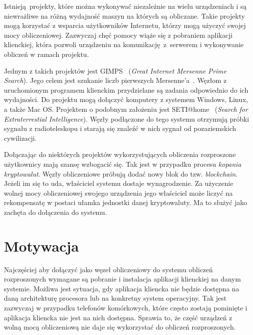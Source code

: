 \documentclass[a4paper,11pt,twoside]{report}
\theoremstyle{definition}
\begin{document}
    Istnieją projekty, które można wykonywać niezależnie na wielu urządzeniach i są niewrażliwe na różną wydajność maszyn na których są obliczane.
    Takie projekty mogą korzystać z wsparcia użytkowników Internetu, którzy mogą użyczyć swojej mocy obliczeniowej.
    Zazwyczaj chęć pomocy wiąże się z pobraniem aplikacji klienckiej, która pozwoli urządzeniu na komunikację z~serwerem i wykonywanie obliczeń w ramach projektu.
    
    Jednym z takich projektów jest GIMPS~\cite{GIMPS} (\textit{Great Internet Mersenne Prime Search}).
    Jego celem jest szukanie liczb pierwszych Mersenne'a~\cite{MersennePrimes}.
    Węzłom z uruchomionym programem klienckim przydzielane są zadania odpowiednio do ich wydajności.
    Do projektu mogą dołączyć komputery z systemem Windows, Linux, a także Mac OS.
    Projektem o podobnym założeniu jest SETI@home~\cite{SETI} (\textit{\textit{Search for Extraterrestial Intelligence}}).
    Węzły podłączone do tego systemu otrzymują próbki sygnału z radioteleskopu i starają się znaleźć w nich sygnał od pozaziemskich cywilizacji.
    
    Dołączając do niektórych projektów wykorzystujących obliczenia rozproszone użytkownicy mają szansę wzbogacić się.
    Tak jest w przypadku procesu \textit{kopania kryptowalut}.
    Węzły obliczeniowe próbują dodać nowy blok do tzw. \textit{blockchain}.
    Jeżeli im się to uda, właściciel systemu dostaje wynagrodzenie.
    Za użyczenie wolnej mocy obliczeniowej swojego urządzenia jego właściciel może liczyć na rekompensatę w postaci ułamka jednostki danej kryptowaluty.
    Ma to służyć jako zachęta do dołączenia do systemu.
    
    \section{Motywacja}
    
    Najczęściej aby dołączyć jako węzeł obliczeniowy do systemu obliczeń rozproszonych wymagane są
    pobranie i instalacja aplikacji klienckiej na danym systemie.
    Możliwa jest sytuacja, gdy aplikacja kliencka nie będzie dostępna na daną architekturę procesora
    lub na konkretny system operacyjny.
    Tak jest zazwyczaj w przypadku telefonów komórkowych, które często zostają pominięte i aplikacja
    kliencka nie jest na nich dostępna.
    Sprawia to, że część urządzeń z wolną mocą obliczeniową nie daje się wykorzystać do obliczeń
    rozproszonych.
    
\end{document}

